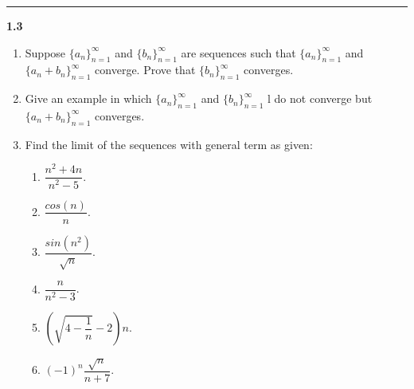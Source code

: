 \documentclass[fleqn]{article}
\begin{document}
  \rule{15cm}{2pt}

  \textbf{1.3}
  \begin{enumerate}
    \item Suppose $\{a_n\}_{n=1}^{\infty}$ and $\{b_n\}_{n=1}^{\infty}$ are sequences such that $\{a_n\}_{n=1}^{\infty}$
    and $\{a_n+b_n\}_{n=1}^{\infty}$ converge. Prove that $\{b_n\}_{n=1}^{\infty}$ converges.

    \item Give an example in which $\{a_n\}_{n=1}^{\infty}$ and $\{b_n\}_{n=1}^{\infty}$ l do not converge but 
    $\{a_n+b_n\}_{n=1}^{\infty}$ converges.


    \item Find the limit of the sequences with general term as given:
    \begin{enumerate}
      \item $\dfrac{n^2+4n}{n^2-5}$.

      \item $\dfrac{cos(n)}{n}$.
      
      \item $\dfrac{sin(n^2)}{\sqrt{n}}$.
      
      \item $\dfrac{n}{n^2-3}$.
      
      \item $\left(\sqrt{4-\dfrac{1}{n}}-2\right)n$.

      \item $(-1)^n \dfrac{\sqrt{n}}{n+7}$.
    \end{enumerate}

  \end{enumerate}
\end{document}
